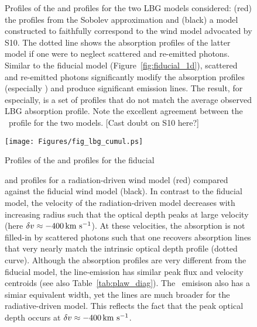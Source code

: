 \documentclass[12pt,preprint]{aastex}
\begin{document}
\begin{figure}
\caption{
Profiles of the  and  profiles for the two
LBG models considered: (red) the profiles from the 
Sobolev approximation 
and (black) a model constructed to faithfully
correspond to the wind model advocated by S10.  The dotted line
shows the absorption profiles of the latter model if one were
to neglect scattered and re-emitted photons.  Similar to the fiducial
model (Figure~\ref{fig:fiducial_1d}), scattered and re-emitted photons
significantly modify the absorption profiles (especially )
and produce significant emission lines.  
The result, for  especially, is a set of profiles that do
not match the average observed LBG absorption profile.
Note the excellent agreement
between the \mgiia\ profile for the two models. [Cast doubt on S10
here?]
}
\label{fig:LBG_spec}
\end{figure}

\begin{figure}
\texttt{[image: Figures/fig\_lbg\_cumul.ps]}
\caption{
Profiles of the  and  profiles for the fiducial
}
\label{fig:LBG_cumul}
\end{figure}



\begin{figure}
\caption{
 and 
profiles for a radiation-driven wind model (red) compared against the
fiducial wind model (black).  In contrast to the fiducial model, the
velocity of the radiation-driven model decreases with increasing
radius such that the optical depth peaks at large velocity (here $\delta v
\approx -400 \, {\rm km~s^{-1}}$).  At these velocities, the absorption is not
filled-in by scattered photons such that one recovers absorption lines
that very nearly match the intrinsic optical depth profile (dotted
curve).  Although the  absorption profiles are very
different from the fiducial model, the  line-emission has
similar peak flux and velocity centroids (see also
Table~\ref{tab:plaw_diag}).  The \feiis\ emisison also has a simiar
equivalent width, yet the lines are much broader for the
radiative-driven model. This reflects the fact that the peak optical
depth occurs at $\delta v \approx -400 \, {\rm km~s^{-1}}$.
}
\label{fig:rad_spec}
\end{figure}
\end{document}
